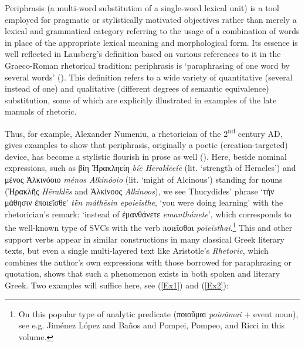 \documentclass[output=paper,colorlinks,citecolor=brown]{langscibook}
\begin{document}
\largerpage
Periphrasis (a multi-word substitution of a single-word lexical unit) is a tool employed for pragmatic or stylistically motivated objectives rather than merely a lexical and grammatical category referring to the usage of a combination of words in place of the appropriate lexical meaning and morphological form. Its essence is well reflected in Lausberg's definition based on various references to it in the Graeco-Roman rhetorical tradition: periphrasis is ‘paraphrasing of one word by several words' (\citealt[§590]{Lausberg1998}). This definition refers to a wide variety of quantitative (several instead of one) and qualitative (different degrees of semantic equivalence) substitution, some of which are explicitly illustrated in examples of the late manuals of rhetoric. 


Thus, for example, Alexander Numeniu, a rhetorician of the 2\textsuperscript{nd} century AD, gives examples to show that periphrasis, originally a poetic (creation-targeted) device, has become a stylistic flourish in prose as well (\citealt[32]{Spengel1853}). Here, beside nominal expressions, such as βίη Ἡρακληείη \textit{bíē Hēraklēeíē} (lit. ‘strength of Heracles’) and μένος Ἀλκινόοιο \textit{ménos Alkinóoio} (lit. ‘might of Alcinous’) standing for nouns (Ἡρακλῆς \textit{Hēraklē̃s} and Ἀλκίνοος \textit{Alkínoos}), we see Thucydides’ phrase ‘τὴν μάθησιν ἐποιεῖσθε' \textit{tḕn máthēsin epoieĩsthe}, ‘you were doing learning’ with the rhetorician’s remark: ‘instead of ἐμανθάνετε \textit{emanthánete}’, which corresponds to the well-known type of SVCs with the verb ποιεῖσθαι \textit{poieĩsthai}.\footnote{On this popular type of analytic predicate (ποιοῦμαι \textit{poioũmai} + event noun), see e.g. Jiménez López and Baños and Pompei, Pompeo, and Ricci in this volume.} This and other support verbs appear in similar constructions in many classical Greek literary texts, but even a single multi-layered text like Aristotle’s \textit{Rhetoric}, which combines the author’s own expressions with those borrowed for paraphrasing or quotation, shows that such a phenomenon exists in both spoken and literary Greek. Two examples will suffice here, see (\ref{Ex1}) and (\ref{Ex2}): 
\end{document}
